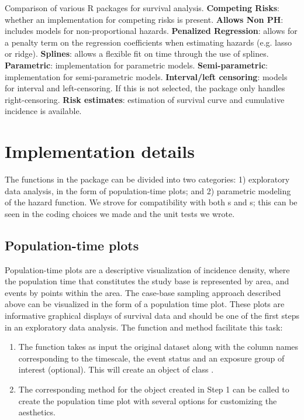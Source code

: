 \begin{table}[ht]
{}
\caption{Comparison of various R packages for survival analysis. \textbf{Competing Risks}: whether an implementation for competing risks is present. \textbf{Allows Non PH}: includes models for non-proportional hazards. \textbf{Penalized Regression}: allows for a penalty term on the regression coefficients when estimating hazards (e.g. lasso or ridge). \textbf{Splines}: allows a flexible fit on time through the use of splines. \textbf{Parametric}: implementation for parametric models. \textbf{Semi-parametric}: implementation for semi-parametric models. \textbf{Interval/left censoring}: models for interval and left-censoring. If this is not selected, the package only handles right-censoring. \textbf{Risk estimates}: estimation of survival curve and cumulative incidence is available.}
\label{tab:surv-pkgs}
\end{table}

\hypertarget{implementation-details}{%
\section{Implementation details}\label{implementation-details}}

The functions in the  package can be divided into two
categories: 1) exploratory data analysis, in the form of population-time
plots; and 2) parametric modeling of the hazard function. We strove for
compatibility with both s and s; this
can be seen in the coding choices we made and the unit tests we wrote.

\hypertarget{population-time-plots}{%
\subsection{Population-time plots}\label{population-time-plots}}

Population-time plots are a descriptive visualization of incidence
density, where the population time that constitutes the study base is
represented by area, and events by points within the area. The case-base
sampling approach described above can be visualized in the form of a
population time plot. These plots are informative graphical displays of
survival data and should be one of the first steps in an exploratory
data analysis. The  function and  method
facilitate this task:

\begin{enumerate}
\def\labelenumi{\arabic{enumi}.}
\tightlist
\item
  The  function takes as input the original
  dataset along with the column names corresponding to the timescale,
  the event status and an exposure group of interest (optional). This
  will create an object of class .\\
\item
  The corresponding  method for the object created in Step 1
  can be called to create the population time plot with several options
  for customizing the aesthetics.
\end{enumerate}

